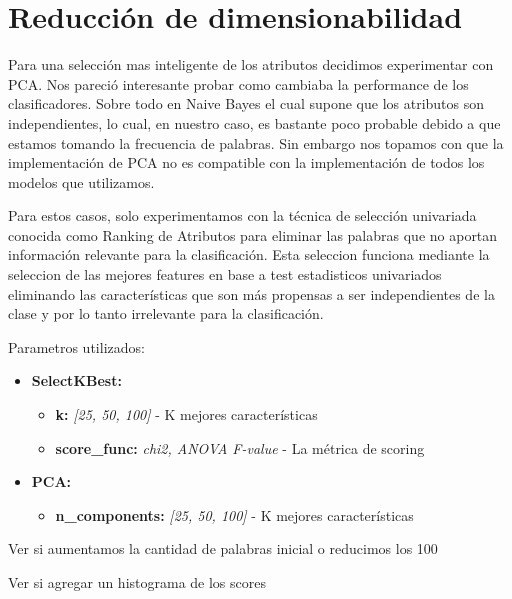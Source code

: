 \section{Reducción de dimensionabilidad}

Para una selección mas inteligente de los atributos decidimos experimentar con PCA. Nos pareció interesante probar como cambiaba la performance de los clasificadores. Sobre todo en Naive Bayes el cual supone que los atributos son independientes, lo cual, en nuestro caso, es bastante poco probable debido a que estamos tomando la frecuencia de palabras. Sin embargo nos topamos con que la implementación de PCA no es compatible con la implementación de todos los modelos que utilizamos. 


Para estos casos, solo experimentamos con la técnica de selección univariada conocida como Ranking de Atributos para eliminar las palabras que no aportan información relevante para la clasificación. Esta seleccion funciona mediante la seleccion de las mejores features en base a test estadisticos univariados eliminando las características que son más propensas a ser independientes de la clase y por lo tanto irrelevante para la clasificación.
  
  
Parametros utilizados:

\begin{itemize}
\item \textbf{SelectKBest:} 
	\begin{itemize}
	\item \textbf{k:} \textit{[25, 50, 100]} - K mejores características
	\item \textbf{score\_func:} \textit{chi2, ANOVA F-value} - La métrica de scoring
	\end{itemize}


\item \textbf{PCA: } 
	\begin{itemize}
	\item \textbf{n\_components:} \textit{[25, 50, 100]} - K mejores características
	\end{itemize}
\end{itemize}



{\Large Ver si aumentamos la cantidad de palabras inicial o reducimos los 100}

{\Large Ver si agregar un histograma de los scores}

